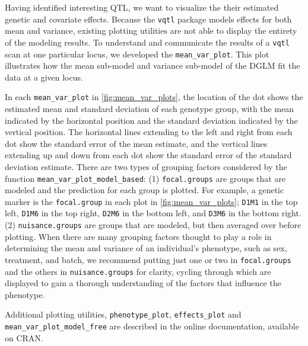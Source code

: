 \documentclass[9pt,twocolumn,twoside]{gsag3jnl}
\begin{document}
Having identified interesting QTL, we want to visualize the their estimated genetic and covariate effects.
Because the \texttt{vqtl} package models effects for both mean and variance, existing plotting utilities are not able to display the entirety of the modeling results.
To understand and communicate the results of a \texttt{vqtl} scan at one particular locus, we developed the \texttt{mean\_var\_plot}.
This plot illustrates how the mean sub-model and variance sub-model of the DGLM fit the data at a given locus.

In each \texttt{mean\_var\_plot} in \autoref{fig:mean_var_plots}, the location of the dot shows the estimated mean and standard deviation of each genotype group, with the mean indicated by the horizontal position and the standard deviation indicated by the vertical position.
The horizontal lines extending to the left and right from each dot show the standard error of the mean estimate, and the vertical lines extending up and down from each dot show the standard error of the standard deviation estimate.
There are two types of grouping factors considered by the function \texttt{mean\_var\_plot\_model\_based}:
(1) \texttt{focal.groups} are groups that are modeled and the prediction for each group is plotted.
For example, a genetic marker is the \texttt{focal.group} in each plot in \autoref{fig:mean_var_plots}; \texttt{D1M1} in the top left, \texttt{D1M6} in the top right, \texttt{D2M6} in the bottom left, and \texttt{D3M6} in the bottom right.
(2) \texttt{nuisance.groups} are groups that are modeled, but then averaged over before plotting.
When there are many grouping factors thought to play a role in determining the mean and variance of an individual's phenotype, such as sex, treatment, and batch, we recommend putting just one or two in \texttt{focal.groups} and the others in \texttt{nuisance.groups} for clarity, cycling through which are displayed to gain a thorough understanding of the factors that influence the phenotype.



Additional plotting utilities, \texttt{phenotype\_plot}, \texttt{effects\_plot} and \texttt{mean\_var\_plot\_model\_free} are described in the online documentation, available on CRAN.
\end{document}
